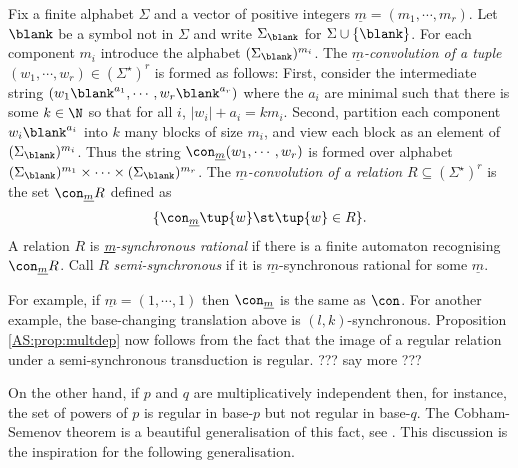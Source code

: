 \begin{definition}
Fix a finite alphabet $\Sigma$ and a vector of positive integers $\underline{m} = (m_1,\cdots,m_r)$.  
Let $\blank$ be a symbol not in $\Sigma$ and write $\Sigma_{\blank}$ for $\Sigma \cup \{\blank\}$.
For each component $m_i$ introduce the alphabet 
$(\Sigma_{\blank})^{m_i}$.  The {\em $\underline{m}$-convolution of a tuple} 
$(w_1,\cdots,w_r) \in (\Sigma^{\star})^r$ is formed as follows: First, consider the intermediate
string $(w_1\blank^{a_1}, \cdots, w_r\blank^{a_r})$ where the $a_i$ are minimal
such that there is some $k \in \N$ so that for all $i$, $|w_i|+a_i = km_i$. Second,
partition each component $w_i\blank^{a_i}$ into $k$ many blocks of size $m_i$,
and view each block as an element of $(\Sigma_{\blank})^{m_i}$. Thus the string
$\con_{\underline{m}} (w_1,\cdots,w_r)$ is formed over alphabet
$(\Sigma_{\blank})^{m_1} \times \cdots \times (\Sigma_{\blank})^{m_r}$.
The {\em $\underline{m}$-convolution of a relation} $R \subseteq (\Sigma^{\star})^r$ is the
set $\con_{\underline{m}} R$ defined as 
\[
\{\con_{\underline{m}} \tup{w} \st \tup{w} \in R\}.
\]
A relation $R$ is {\em \underline{m}-synchronous rational} if there is a finite automaton
recognising $\con_{\underline{m}} R$.
Call $R$ {\em semi-synchronous} if it is $\underline{m}$-synchronous rational for some $\underline{m}$.
\end{definition}

For example, if $\underline{m} = (1,\cdots, 1)$ then $\con_{\underline{m}}$ is the same as $\con$.
For another example, the base-changing translation above is $(l,k)$-synchronous. Proposition \ref{AS:prop:multdep} now follows
from the fact that the image of a regular relation under a semi-synchronous transduction is regular.
??? say more ???

On the other hand, if $p$ and $q$ are multiplicatively independent then, for instance, the set of powers of $p$ is regular in base-$p$ but not
regular in base-$q$. The Cobham-Semenov theorem is a beautiful generalisation of this fact, see \cite{}.
This discussion is the inspiration for the following generalisation.



